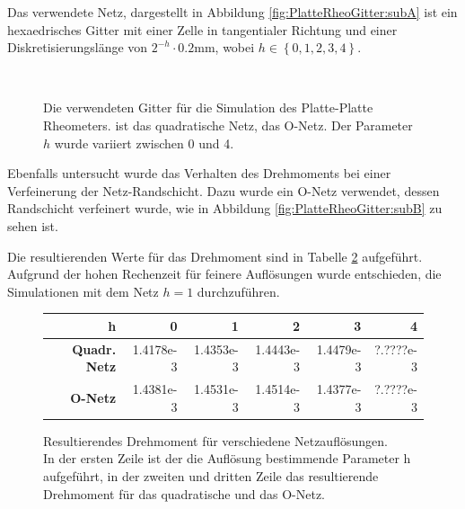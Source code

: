 Das verwendete Netz, dargestellt in Abbildung \ref{fig:PlatteRheoGitter:subA} ist ein hexaedrisches Gitter mit einer Zelle in tangentialer Richtung und einer Diskretisierungslänge von $2^{-h} \cdot 0.2\mbox{mm}$, wobei $h\in\left\{ 0,1,2,3,4 \right\}$.
%
\begin{figure}
    \centering
    \\
    \caption{Die verwendeten Gitter für die Simulation des Platte-Platte Rheometers.  ist das quadratische Netz,  das O-Netz.
    Der Parameter $h$ wurde variiert zwischen 0 und 4.}
    \label{fig:PlatteRheoGitter}
\end{figure}
%

Ebenfalls untersucht wurde das Verhalten des Drehmoments bei einer Verfeinerung der Netz-Randschicht. Dazu wurde ein O-Netz verwendet, dessen Randschicht verfeinert wurde, wie in Abbildung \ref{fig:PlatteRheoGitter:subB} zu sehen ist.

Die resultierenden Werte für das Drehmoment sind in Tabelle \ref{fig:ResultingTorque} aufgeführt. Aufgrund der hohen Rechenzeit für feinere Auflösungen wurde entschieden, die Simulationen mit dem Netz $h=1$ durchzuführen.
%
\begin{figure}
    \centering
    \begin{tabular}{r r r r r r}
        \textbf{h} \vline & 0 & 1 & 2 & 3 & 4\\
        \hline
        \textbf{Quadr. Netz} \vline & 1.4178e-3 & 1.4353e-3 & 1.4443e-3 & 1.4479e-3 & ?.????e-3\\
        \textbf{O-Netz} \vline & 1.4381e-3 & 1.4531e-3 & 1.4514e-3 & 1.4377e-3 & ?.????e-3
    \end{tabular}
    \caption{Resultierendes Drehmoment für verschiedene Netzauflösungen.\\
    In der ersten Zeile ist der die Auflösung bestimmende Parameter h aufgeführt, in der zweiten und dritten Zeile das resultierende Drehmoment für das quadratische und das O-Netz.}
    \label{fig:ResultingTorque}
\end{figure}
%
